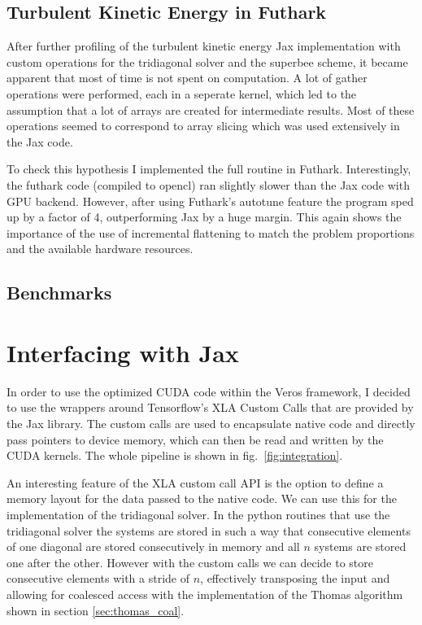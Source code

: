\documentclass[a4paper,oneside]{memoir}
\begin{document}
\subsection{Turbulent Kinetic Energy in Futhark}
After further profiling of the turbulent kinetic energy Jax implementation with custom operations for the tridiagonal solver and the superbee scheme, it became apparent that most of time is not spent on computation. A lot of gather operations were performed, each in a seperate kernel, which led to the assumption that a lot of arrays are created for intermediate results. Most of these operations seemed to correspond to array slicing which was used extensively in the Jax code. 

To check this hypothesis I implemented the full routine in Futhark. 
Interestingly, the futhark code (compiled to opencl) ran slightly slower than the Jax code with GPU backend. However, after using Futhark's autotune feature the program sped up by a factor of 4, outperforming Jax by a huge margin. This again shows the importance of the use of incremental flattening to match the problem proportions and the available hardware resources.


\subsection{Benchmarks}
\section{Interfacing with Jax}
\label{sec:integrate}
In order to use the optimized CUDA code within the Veros framework, I decided to use the wrappers around Tensorflow's \cite{tensorflow} XLA Custom Calls that are provided by the Jax library. The custom calls are used to encapsulate native code and directly pass pointers to device memory, which can then be read and written by the CUDA kernels. The whole pipeline is shown in fig.~\ref{fig:integration}.

An interesting feature of the XLA custom call API is the option to define a memory layout for the data passed to the native code. We can use this for the implementation of the tridiagonal solver. In the python routines that use the tridiagonal solver the systems are stored in such a way that consecutive elements of one diagonal are stored consecutively in memory and all $n$ systems are stored one after the other. However with the custom calls we can decide to store consecutive elements with a stride of $n$, effectively transposing the input and allowing for coalesced access with the implementation of the Thomas algorithm shown in section \ref{sec:thomas_coal}.
\end{document}
